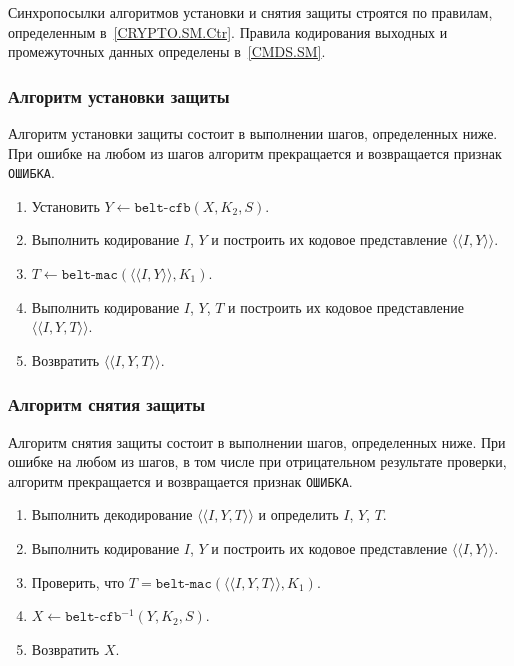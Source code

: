 Синхропосылки алгоритмов установки и снятия защиты строятся по правилам, 
определенным в~\ref{CRYPTO.SM.Ctr}. 
Правила кодирования выходных и промежуточных данных определены в~\ref{CMDS.SM}.

\subsubsection{Алгоритм установки защиты}
\label{CRYPTO.SM.Algs.Encr}

Алгоритм установки защиты состоит в выполнении шагов, определенных ниже.
При ошибке на любом из шагов алгоритм прекращается и возвращается признак 
\texttt{ОШИБКА}.

\begin{enumerate}
\item
Установить $Y\gets\texttt{belt-cfb}(X, K_2, S)$.

\item
Выполнить кодирование $I$, $Y$ и построить их кодовое 
представление $\langle\langle I, Y\rangle\rangle$.

\item
$T\gets\texttt{belt-mac}(\langle\langle I, Y \rangle\rangle, K_1)$.

\item
Выполнить кодирование $I$, $Y$, $T$ и построить их кодовое 
представление $\langle\langle I, Y, T \rangle\rangle$.

\item
Возвратить $\langle\langle I, Y, T \rangle\rangle$.
\end{enumerate}

\subsubsection{Алгоритм снятия защиты}
\label{CRYPTO.SM.Algs.Decr}

Алгоритм снятия защиты состоит в выполнении шагов, определенных ниже. При 
ошибке на любом из шагов, в том числе при отрицательном результате 
проверки, алгоритм прекращается и возвращается признак \texttt{ОШИБКА}.

\begin{enumerate}
\item
Выполнить декодирование $\langle\langle I, Y, T \rangle\rangle$ 
и определить $I$, $Y$, $T$.
 
\item
Выполнить кодирование $I$, $Y$ и построить их кодовое представление 
$\langle\langle I, Y \rangle\rangle$.
 
\item
Проверить, 
что $T=\texttt{belt-mac}(\langle\langle I, Y, T\rangle\rangle, K_1)$.
 
\item
$X\leftarrow\texttt{belt-cfb}^{-1}(Y, K_2, S)$.
 
\item
Возвратить $X$.
\end{enumerate}

